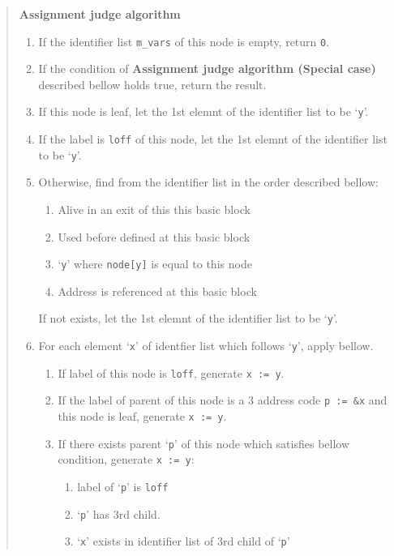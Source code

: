 \begin{quote}
{\bf Assignment judge algorithm}

\begin{enumerate}
\item If the identifier list {\tt{m\_vars}} of this node is empty,
      return {\tt{0}}.
\item  \label{optimize_e067}
      If the condition of
      {\bf Assignment judge algorithm (Special case) }
      described bellow holds true, return the result.
\item \label{optimize_e055}
      If this node is leaf, 
      let the 1st elemnt of the identifier list to be `{\tt{y}}'.
\item If the label is {\tt{loff}} of this node,
      let the 1st elemnt of the identifier list to be `{\tt{y}}'.
\item \label{optimize_e054}
      Otherwise,
      find from the identifier list in the order described bellow:
      \begin{enumerate}
      \item Alive in an exit of this this basic block
      \item Used before defined at this basic block
      \item `{\tt{y}}' where {\tt{node[y]}} is equal to this node
      \item Address is referenced at this basic block
      \end{enumerate}
      If not exists, let the 1st elemnt of the identifier list to be `{\tt{y}}'.
 \item 
      For each element `{\tt{x}}' of identfier list which follows `{\tt{y}}',
      apply bellow.
\begin{enumerate}
\item If label of this node is {\tt{loff}},  generate {\tt{x := y}}.
\item \label{optimize_e052}
      If the label of parent of this node is a 3 address code
      {\tt{p := \&x}} and this node is leaf, generate {\tt{x := y}}.
\item If there exists parent `{\tt{p}}' of this node which satisfies
      bellow condition, generate {\tt{x := y}}:
      \begin{enumerate}
      \item label of `{\tt{p}}' is {\tt{loff}}
      \item `{\tt{p}}' has 3rd child.
      \item `{\tt{x}}' exists in identifier list of 3rd child of `{\tt{p}}'
      \end{enumerate}

\end{enumerate}
\end{enumerate}
\end{quote}
